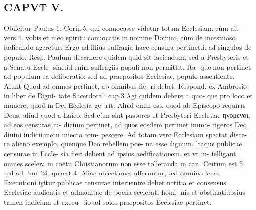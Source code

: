 \documentclass{article}
\begin{document}
\begin{pages}
\section*{CAPVT V. }
\marginpar{[ p.247 ]} Obiicitur Paulus 1. Corin.5. qui conuocasse videtur totam Ecclesiam, cùm ait vers.4. vobis et meo spiritu conuocatis in nomine Domini, cùm de incestuoso iudicando ageretur. Ergo ad illius suffragia haec censura pertinet.i. ad singulos de populo. Resp. Paulum decernere quidem quid sit faciendum, sed a Presbyteris et a Senatu Eccle- siae:id enim suffragiis populi non permittit. Ita- que non pertinet ad populum ea deliberatio: sed ad praepositos Ecclesiae, populo assentiente. Aiunt Quod ad omnes pertinet, ab omnibus fie- ri debet. Respond. ex Ambrosio in liber  de Digni- tate Sacerdotal. cap.3 Agi quidem debere a quo- que pro loco et munere, quod in Dei Ecclesia ge- rit. Aliud enim est, quod ab Episcopo requirit Deus: aliud quod a Laico. Sed cùm sint pastores et Presbyteri Ecclesiae ηγομενοι, ad eos censurae iu- dicium pertinet, ad quos eosdem pertinet immo- rigeros Deo diuini iudicii metu iniecto com- pescere. Ad totam vero Ecclesiam spectat disce- re alieno exemplo, quenque Deo rebellem poe- na esse dignum. ltaque publicae censurae in Eccle- sia fieri debent ad ipsius aedificationem, et vt in- telligant omnes scelera in coetu Christianorum non esse tolleranda in can. Certum est 5 sed ad- huc 24. quaest.4. Aliae obiectiones afferuntur, sed omnino leues Executioni igitur publicae censurae interuenire debet notitia et consensus Ecclesiae audientis et admonitae de poena scelerati homi- nis et obstinati:ipsius tamen iudicium et execu- tio ad solos praepositos Ecclesiae pertinet.  \pend

\end{pages}
\end{document}
